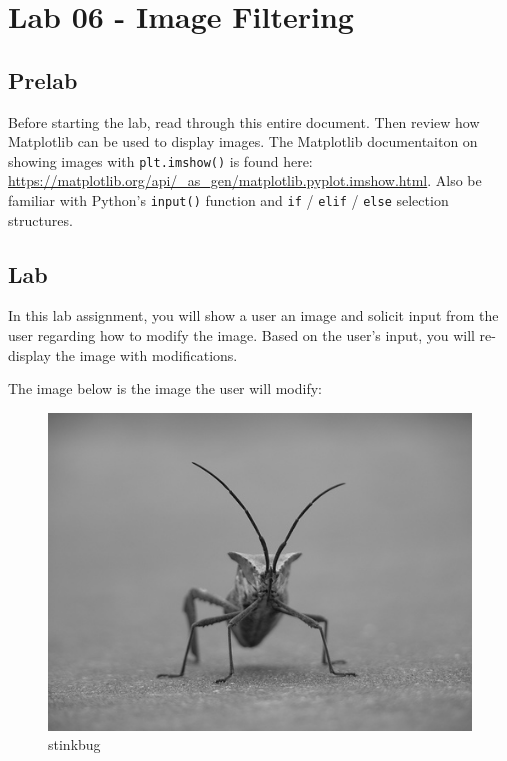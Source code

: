 \documentclass[11pt]{article}
\begin{document}
  
\hypertarget{lab-06---image-filtering}{%
\section{Lab 06 - Image Filtering}\label{lab-06---image-filtering}}

\hypertarget{prelab}{%
\subsection{Prelab}\label{prelab}}

Before starting the lab, read through this entire document. Then review
how Matplotlib can be used to display images. The Matplotlib
documentaiton on showing images with \texttt{plt.imshow()} is found
here:
\url{https://matplotlib.org/api/_as_gen/matplotlib.pyplot.imshow.html}.
Also be familiar with Python's \texttt{input()} function and \texttt{if}
/ \texttt{elif} / \texttt{else} selection structures.

\hypertarget{lab}{%
\subsection{Lab}\label{lab}}

In this lab assignment, you will show a user an image and solicit input
from the user regarding how to modify the image. Based on the user's
input, you will re-display the image with modifications.

The image below is the image the user will modify:

\begin{figure}[!h]
\centering
\includegraphics[scale=0.3]{stinkbug.png}
\caption{stinkbug}
\end{figure}
\end{document}
